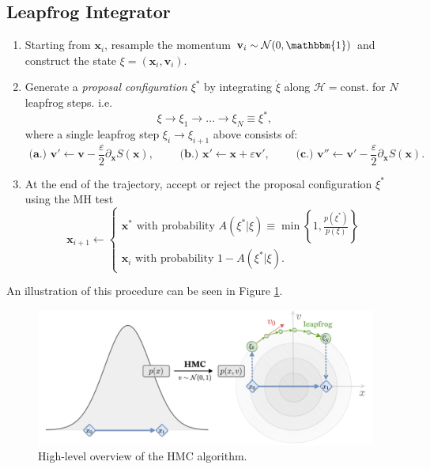 \documentclass[a4paper,11pt]{article}
\newcommand{\x}{\mathbf{x}}
\newcommand{\p}{\mathbf{v}}
\newcommand{\acceptProb}{%
            A(\xi^{\ast}|\xi) \equiv \min\left\{1,
            \frac{p(\xi^{\ast})}{p(\xi)}\right\}
    }
\begin{document}
\subsection{\label{subsec:lfint}Leapfrog Integrator}
%
\begin{enumerate}
    \item Starting from \(\x_{i}\), resample the momentum \(\p_{i}\sim
        \mathcal{N} (0, \mathbbm{1})\) and construct the state \(\xi =
        (\x_i, \p_i)\).
    \item Generate a \emph{proposal configuration} \(\xi^{\ast}\) by
        integrating \(\dot\xi\) along \(\mathcal{H} = \mathrm{const.}\)
        for \(N\) leapfrog steps.
        i.e.
        \begin{equation}
            \xi \rightarrow \xi_{1}\rightarrow\ldots\rightarrow
            \xi_{N} \equiv \xi^{\ast},
        \end{equation}
        where a single leapfrog step \(\xi_{i} \rightarrow \xi_{i+1}\) above
        consists of:
        \begin{equation}
            \textbf{ (a.) }%
              \p'\leftarrow \p - \frac{\varepsilon}{2}\partial_{\x} S(\x),
            \quad\quad
            \textbf{ (b.) }%
              \x' \leftarrow \x + \varepsilon \p',
            \quad\quad
            \textbf{ (c.) }%
              \p'' \leftarrow \p' - \frac{\varepsilon}{2}\partial_{\x} S(\x).
        \end{equation}
    \item At the end of the trajectory, accept or reject the proposal
        configuration \(\xi^{\ast}\) using the MH test
        \begin{equation}
            \x_{i+1} \leftarrow
            \begin{cases}
                \x^{\ast}\text{ with probability } \acceptProb \\
                \x_{i}\text{ with probability } 1 - A(\xi^{\ast}|\xi).
            \end{cases}
        \end{equation}
\end{enumerate}
%
An illustration of this procedure can be seen in Figure \ref{fig:hmc}.
%
\begin{figure}[htpb]
    \centering
    \includegraphics[width=\textwidth]{assets/hmc.pdf}
    \caption{\label{fig:hmc}High-level overview of the HMC algorithm.}
\end{figure}
%
\end{document}
